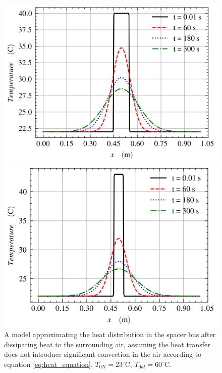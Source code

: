 \documentclass[10pt]{article}
\begin{document}
\begin{figure}[H]
  \centering
  \begin{minipage}[b]{0.45\textwidth}
    \includegraphics[width=\textwidth]{img/sample_holder_and_mask/solid_cylinder_model.png}
    \caption{A model approximating the heat distribution in the spacer bus after dissipating heat to the surrounding air, assuming the heat transfer does not introduce significant convection in the air according to equation \ref{eq:heat_equation}. $T_{0N} = 23^\circ$C, $T_{0al} = 60^\circ$C.}
    \label{fig:solid_cilinder model}
  \end{minipage}
  \hfill
  \begin{minipage}[b]{0.45\textwidth}
    \includegraphics[width=1\textwidth]{img/sample_holder_and_mask/reduced_cylinder_model.png}

\end{minipage}
\end{figure}
\end{document}
